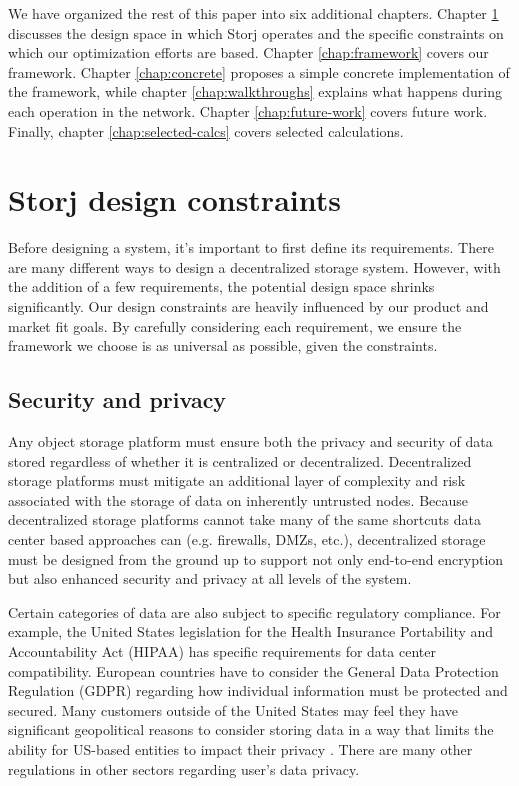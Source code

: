 \documentclass[8pt,fleqn,openany]{book}
\begin{document}
We have organized the rest of this paper into six additional
chapters. Chapter \ref{chap:design-constraints} discusses the design space
in which Storj operates and the specific constraints on which
our optimization efforts are based.
Chapter \ref{chap:framework} covers our framework. Chapter
\ref{chap:concrete}
proposes a simple concrete implementation of the framework,
while chapter \ref{chap:walkthroughs} explains what happens
during each operation in the network. Chapter
\ref{chap:future-work} covers future work.
Finally, chapter \ref{chap:selected-calcs} covers selected calculations.

\chapter{Storj design constraints}\label{chap:design-constraints}

Before designing a system, it's important to first define its requirements.
There are many different ways to design a decentralized storage system. However,
with the addition of a few requirements, the potential design space shrinks
significantly.
Our design constraints are heavily influenced by our product and
market fit goals.
By carefully considering each requirement, we ensure the framework
we choose is as universal as possible, given the constraints.

\section{Security and privacy}

Any object storage platform must ensure both the privacy and
security of data stored regardless of whether it is centralized or decentralized.
Decentralized storage platforms must mitigate an additional layer of
complexity and risk associated with the storage of data on inherently
untrusted nodes. Because decentralized storage platforms cannot take many
of the same shortcuts data center based approaches can (e.g. firewalls, DMZs,
etc.), decentralized storage must be designed from the ground up to support
not only end-to-end encryption but also enhanced security and privacy at all levels of the
system.

Certain categories of data are also subject to specific regulatory compliance.
For example, the United States legislation for
the Health Insurance Portability and
Accountability Act (HIPAA) has specific requirements for data center
compatibility. European countries have to consider the General Data Protection
Regulation (GDPR) regarding
how individual information must be protected and secured.
Many customers outside of the United States may feel they have significant
geopolitical reasons to consider storing data in a way that limits the ability
for US-based entities to impact their privacy \cite{kopano}.
There are many other regulations in other sectors regarding user's data privacy.
\end{document}
